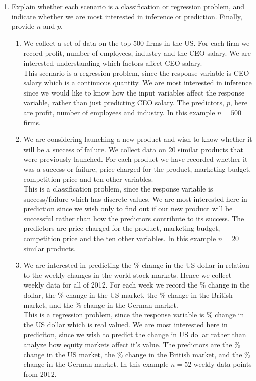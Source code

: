 \documentclass[11pt]{article}
\begin{document}
\begin{enumerate}
\item Explain whether each scenario is a classification or regression problem, and indicate whether we are most interested in inference or prediction.  Finally, provide $n$ and $p$.
\begin{enumerate}
\item We collect a set of data on the top 500 firms in the US.  For each firm we record profit, number of employees, industry and the CEO salary.  We are interested understanding which factors affect CEO salary.\\

This scenario is a regression problem, since the response variable is CEO salary which is a continuous quantity.  We are most interested in inference since we would like to know how the input variables affect the response variable, rather than just predicting CEO salary.  The predictors, $p$, here are profit, number of employees and industry.  In this example $n=500$ firms.
\item We are considering launching a new product and wish to know whether it will be a success of failure.  We collect data on 20 similar products that were previously launched.  For each product we have recorded whether it was a success or failure, price charged for the product, marketing budget, competition price and ten other variables.\\

This is a classification problem, since the response variable is success/failure which has discrete values.  We are most interested here in prediction since we wish only to find out if our new product will be successful rather than how the predictors contribute to its success.  The predictors are price charged for the product, marketing budget, competition price and the ten other variables.  In this example $n=20$ similar products.

\item We are interested in predicting the \% change in the US dollar in relation to the weekly changes in the world stock markets.  Hence we collect weekly data for all of 2012.  For each week we record the \% change in the dollar, the \% change in the US market, the \% change in the British market, and the \% change in the German market. \\

This is a regression problem, since the response variable is \% change in the US dollar which is real valued.  We are most interested here in prediciton, since we wish to predict the change in US dollar rather than analyze how equity markets affect it's value.  The predictors are the \% change in the US market, the \% change in the British market, and the \% change in the German market.  In this example $n=52$ weekly data points from 2012.
\end{enumerate}


\end{enumerate}
\end{document}
